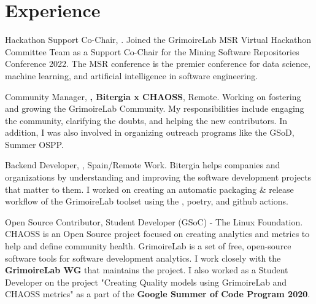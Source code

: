 \documentclass[11pt,a4paper,sans]{moderncv} %
\begin{document}

\section{Experience}

{
    Hackathon Support Co-Chair, \textbf{}.
    \newline
    Joined the GrimoireLab MSR Virtual Hackathon Committee Team as a Support Co-Chair for the Mining Software Repositories Conference 2022. The MSR conference is the premier conference for data science, machine learning, and artificial intelligence in software engineering.
}

{
    Community Manager, \textbf{, Bitergia x CHAOSS}, Remote.
    \newline
    Working on fostering and growing the GrimoireLab Community. My responsibilities include engaging the community, clarifying the doubts, and helping the new contributors. In addition, I was also involved in organizing outreach programs like the GSoD, Summer OSPP.
}

{
    Backend Developer, \textbf{}, Spain/Remote Work.
    \newline
    Bitergia helps companies and organizations by understanding and improving the software development projects that matter to them. I worked on creating an automatic packaging \& release workflow of the GrimoireLab toolset using the , poetry, and github actions.
}

{
    Open Source Contributor, Student Developer (GSoC) \textbf{} - The Linux Foundation.
    \newline
    CHAOSS is an Open Source project focused on creating analytics and metrics to help and define community health. GrimoireLab is a set of free, open-source software tools for software development analytics. I work closely with the \textbf{GrimoireLab WG} that maintains the project.
    \newline
    I also worked as a Student Developer on the project "Creating Quality models using GrimoireLab and CHAOSS metrics" as a part of the \textbf{Google Summer of Code Program 2020}.
}
\end{document}
